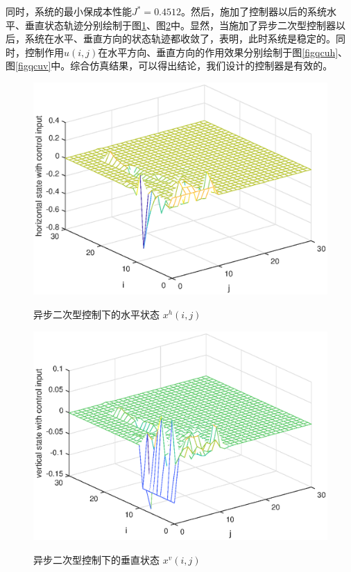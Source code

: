 	同时，系统的最小保成本性能$J^{*}=0.4512$。然后，施加了控制器以后的系统水平、垂直状态轨迹分别绘制于图\ref{figqchstate1}、图\ref{figqcvstate1}中。显然，当施加了异步二次型控制器以后，系统在水平、垂直方向的状态轨迹都收敛了，表明，此时系统是稳定的。同时，控制作用$u(i,j)$在水平方向、垂直方向的作用效果分别绘制于图\ref{figqcuh}、图\ref{figqcuv}中。综合仿真结果，可以得出结论，我们设计的控制器是有效的。
	\begin{figure}[!htb]
		\centering\includegraphics[scale=0.6]{./figures/qc/simulation/hstate.eps}\\ 
		\caption{异步二次型控制下的水平状态 $x^{h}(i,j)$}
		\label{figqchstate1}
	\end{figure}
	
	\begin{figure}[!htb]
		\centering\includegraphics[scale=0.6]{./figures/qc/simulation/vstate.eps}\\ 
		\caption{异步二次型控制下的垂直状态 $x^{v}(i,j)$}
		\label{figqcvstate1}
	\end{figure}
	

